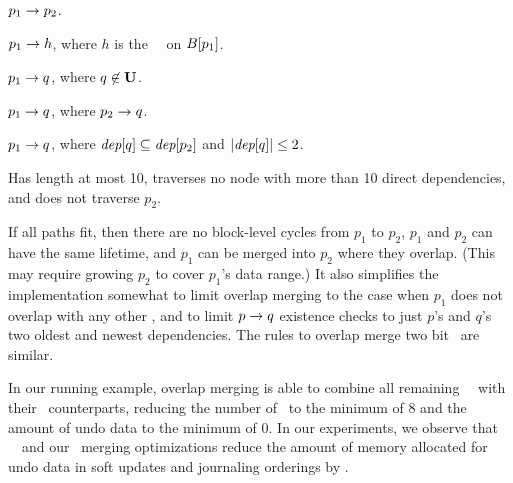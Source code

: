 \begin{xcompactitemize}
\item $p_1 \rightarrow p_2$.
\item $p_1 \rightarrow h$, where $h$ is the \nrb\ \patch\ on $B[{p_1}]$.
\item $p_1 \rightarrow q$, where $q \not\in \PMem$.
\item $p_1 \rightarrow q$, where $p_2 \rightarrow q$.
\item $p_1 \rightarrow q$, where $\textit{dep}[q] \subseteq \textit{dep}[p_2]$
  and $|\textit{dep}[q]| \leq 2$.
\item Has length at most 10, traverses no node with more than 10
  direct dependencies, and does not traverse $p_2$.
\end{xcompactitemize}

\noindent
%
If all paths fit, then there are no block-level cycles from $p_1$
to $p_2$, $p_1$ and $p_2$ can have the same lifetime, and $p_1$ can be
merged into $p_2$ where they overlap.
%
(This may require growing $p_2$ to cover $p_1$'s data range.)
%
It also simplifies the implementation somewhat to limit overlap
merging to the case when $p_1$ does not overlap with any other
\patches, and to limit $p \rightarrow q$ existence checks to just $p$'s
and $q$'s two oldest and newest dependencies.
%
The rules to overlap merge two bit \patches\ are similar.



In our running example, overlap merging is able to combine all remaining
\rb\ \patches\ with their \nrb\ counterparts, reducing the number of \patches\
to the minimum of 8 and the amount of undo data to the minimum of 0.
%
In our experiments, we observe that \nrb\ \patches\ and our \patch\ merging
optimizations reduce the amount of memory allocated for undo data in
soft updates and journaling orderings by \patchoptundo.


